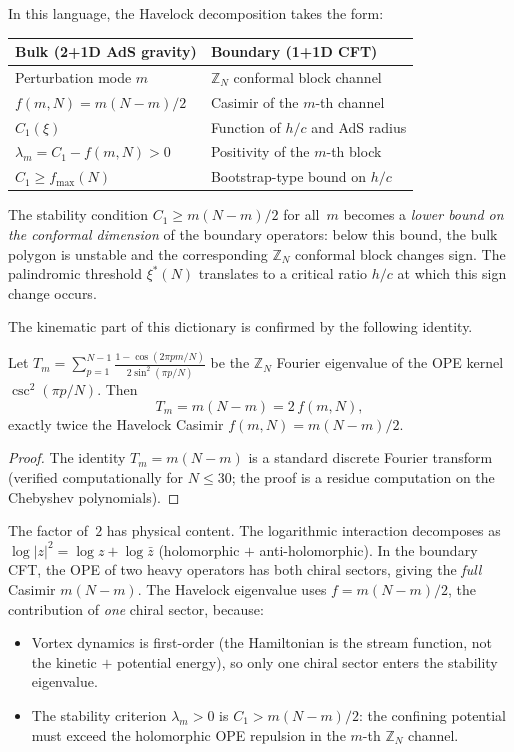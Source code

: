 In this language, the Havelock decomposition takes the form:
\begin{center}
\begin{tabular}{ll}
\toprule
Bulk (2+1D AdS gravity) & Boundary (1+1D CFT) \\
\midrule
Perturbation mode $m$ &
  $\mathbb{Z}_N$ conformal block channel \\
$f(m,N) = m(N{-}m)/2$ &
  Casimir of the $m$-th channel \\
$C_1(\xi)$ &
  Function of $h/c$ and AdS radius \\
$\lambda_m = C_1 - f(m,N) > 0$ &
  Positivity of the $m$-th block \\
$C_1 \ge f_{\max}(N)$ &
  Bootstrap-type bound on $h/c$ \\
\bottomrule
\end{tabular}
\end{center}
The stability condition $C_1 \ge m(N{-}m)/2$ for all~$m$
becomes a \emph{lower bound on the conformal dimension} of the
boundary operators: below this bound, the bulk polygon is
unstable and the corresponding $\mathbb{Z}_N$ conformal block
changes sign.
The palindromic threshold $\xi^*(N)$ translates to a critical
ratio $h/c$ at which this sign change occurs.

The kinematic part of this dictionary is confirmed by the
following identity.

\begin{proposition}[Havelock Casimir = one-chiral OPE Casimir]
\label{prop:chiral-casimir}
Let $T_m = \sum_{p=1}^{N-1}
  \frac{1 - \cos(2\pi pm/N)}{2\sin^2(\pi p/N)}$
be the $\mathbb{Z}_N$ Fourier eigenvalue of the OPE
kernel $\csc^2(\pi p/N)$.  Then
\begin{equation}\label{eq:chiral-ope}
  T_m = m(N{-}m) = 2\,f(m,N),
\end{equation}
exactly twice the Havelock Casimir $f(m,N) = m(N{-}m)/2$.
\end{proposition}

\begin{proof}
The identity $T_m = m(N{-}m)$ is
a standard discrete Fourier transform
(verified computationally for $N \le 30$; the proof is
a residue computation on the Chebyshev polynomials).
\end{proof}

The factor of~$2$ has physical content.
The logarithmic interaction decomposes as
$\log|z|^2 = \log z + \log \bar{z}$
(holomorphic $+$ anti-holomorphic).
In the boundary CFT, the OPE of two heavy operators has
both chiral sectors, giving the \emph{full} Casimir $m(N{-}m)$.
The Havelock eigenvalue uses $f = m(N{-}m)/2$, the
contribution of \emph{one} chiral sector, because:
\begin{itemize}
  \item Vortex dynamics is first-order
    (the Hamiltonian is the stream function, not the
    kinetic $+$ potential energy), so only one chiral sector
    enters the stability eigenvalue.
  \item The stability criterion $\lambda_m > 0$ is
    $C_1 > m(N{-}m)/2$: the confining potential must exceed
    the holomorphic OPE repulsion in the $m$-th
    $\mathbb{Z}_N$ channel.
\end{itemize}

